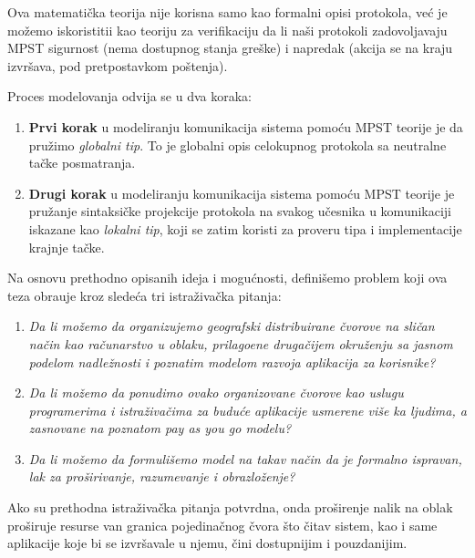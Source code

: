 Ova matemati\v cka teorija nije korisna samo kao formalni opisi protokola, ve\'c je mo\v zemo iskoristitii kao teoriju za verifikaciju da li na\v si protokoli zadovoljavaju MPST sigurnost (nema dostupnog stanja gre\v ske) i napredak (akcija se na kraju izvr\v sava, pod pretpostavkom po\v stenja).

Proces modelovanja odvija se u dva koraka:

\begin{enumerate}[start=1,label={(\bfseries \arabic*)}]
	\item \textbf{Prvi korak} u modeliranju komunikacija sistema pomo\'cu MPST teorije je da pru\v zimo \emph{globalni tip}. To je globalni opis celokupnog protokola sa neutralne ta\v cke posmatranja.
	\item \textbf{Drugi korak} u modeliranju komunikacija sistema pomo\'cu MPST teorije je pru\v zanje sintaksi\v cke projekcije protokola na svakog u\v cesnika u komunikaciji iskazane kao \emph{lokalni tip}, koji se zatim koristi za proveru tipa i implementacije krajnje ta\v cke.
\end{enumerate}

Na osnovu prethodno opisanih ideja i mogu\'cnosti, defini\v semo problem koji ova teza obra\dj uje kroz slede\'ca tri istra\v ziva\v cka pitanja:

\begin{enumerate}[start=1,label={(\bfseries \arabic*)}]\label{rez:questions}
	\item \textit{Da li mo\v zemo da organizujemo geografski distribuirane \v cvorove na sli\v can na\v cin kao ra\v cunarstvo u oblaku, prilago\dj ene druga\v cijem okru\v zenju sa jasnom podelom nadle\v znosti i poznatim modelom razvoja aplikacija za korisnike?}
	\item \textit{Da li mo\v zemo da ponudimo ovako organizovane \v cvorove kao uslugu programerima i istra\v ziva\v cima za budu\'ce aplikacije usmerene vi\v se ka ljudima, a zasnovane na poznatom pay as you go modelu?}
	\item \textit{Da li mo\v zemo da formuli\v semo model na takav na\v cin da je formalno ispravan, lak za pro\v sirivanje, razumevanje i obrazlo\v zenje?}
\end{enumerate}

Ako su prethodna istra\v ziva\v cka pitanja potvrdna, onda pro\v sirenje nalik na oblak pro\v siruje resurse van granica pojedina\v cnog \v cvora \v sto \v citav sistem, kao i same aplikacije koje bi se izvr\v savale u njemu, \v cini dostupnijim i pouzdanijim.

